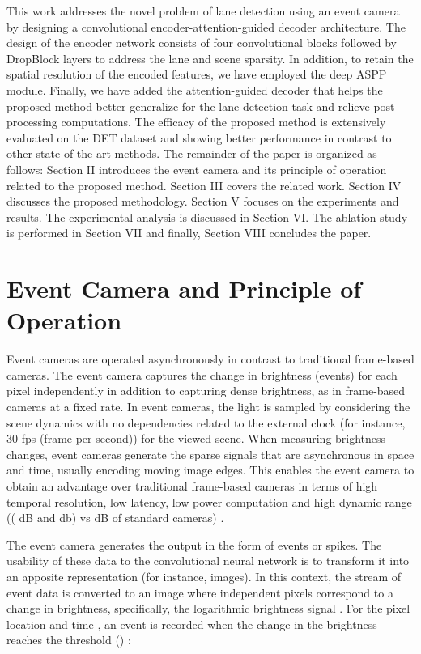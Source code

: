 \documentclass[journal]{IEEEtran}
\begin{document}
 This work addresses the novel problem of lane detection using an event camera by designing a convolutional encoder-attention-guided decoder architecture. The design of the encoder network consists of four convolutional blocks followed by DropBlock layers to address the lane and scene sparsity. In addition, to retain the spatial resolution of the encoded features, we have employed the deep ASPP module. Finally, we have added the attention-guided decoder that helps the proposed method better generalize for the lane detection task and relieve post-processing computations. The efficacy of the proposed method is extensively evaluated on the DET dataset and showing better performance in contrast to other state-of-the-art methods. The remainder of the paper is organized as follows: Section II introduces the event camera and its principle of operation related to the proposed method. Section III covers the related work. Section IV discusses the proposed methodology. Section V focuses on the experiments and results. The experimental analysis is discussed in Section VI. The ablation study is performed in Section VII and finally, Section VIII concludes the paper.

\section{Event Camera and Principle of Operation}
Event cameras are operated asynchronously in contrast to traditional frame-based cameras. The event camera captures the change in brightness (events) for each pixel independently in addition to capturing dense brightness, as in frame-based cameras at a fixed rate. In event cameras, the light is sampled by considering the scene dynamics with no dependencies related to the external clock (for instance, 30 fps (frame per second)) for the viewed scene. When measuring brightness changes, event cameras generate the sparse signals that are asynchronous in space and time, usually encoding moving image edges. This enables the event camera to obtain an advantage over traditional frame-based cameras in terms of high temporal resolution, low latency, low power computation and high dynamic range (( dB and  db) vs  dB of standard cameras) \cite{Gallego2019} \cite{r2}.  
\par
The event camera generates the output in the form of events or spikes. The usability of these data to the convolutional neural network is to transform it into an apposite representation (for instance, images). In this context, the stream of event data is converted to an image where independent pixels correspond to a change in brightness, specifically, the logarithmic brightness signal . For the pixel location  and time , an event is recorded when the change in the brightness reaches the threshold () \cite{r3}: 
\end{document}
